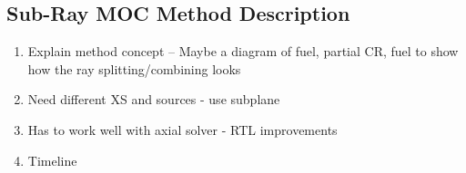 \subsection{Sub-Ray MOC Method Description}

\begin{enumerate}[leftmargin=*]
  \item Explain method concept -- Maybe a diagram of fuel, partial CR, fuel to show how the ray splitting/combining looks
  \item Need different XS and sources - use subplane
  \item Has to work well with axial solver - RTL improvements
  \item Timeline
\end{enumerate}